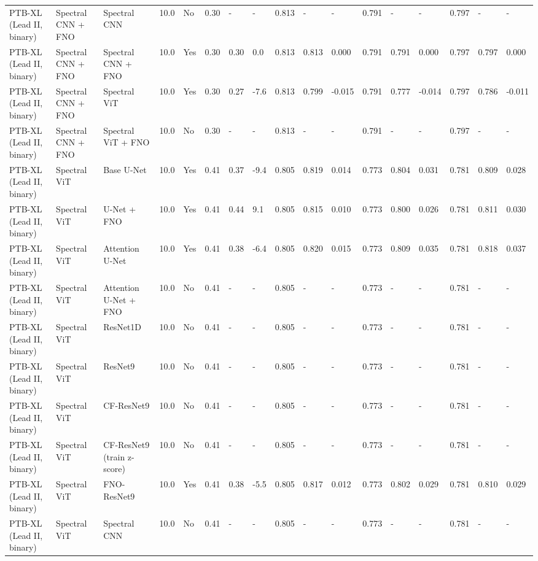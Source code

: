 \begin{longtable}{lllllllllllllllll}
PTB-XL (Lead II, binary) & Spectral CNN + FNO & Spectral CNN & 10.0 & No & 0.30 & - & - & 0.813 & - & - & 0.791 & - & - & 0.797 & - & - \\
PTB-XL (Lead II, binary) & Spectral CNN + FNO & Spectral CNN + FNO & 10.0 & Yes & 0.30 & 0.30 & 0.0 & 0.813 & 0.813 & 0.000 & 0.791 & 0.791 & 0.000 & 0.797 & 0.797 & 0.000 \\
PTB-XL (Lead II, binary) & Spectral CNN + FNO & Spectral ViT & 10.0 & Yes & 0.30 & 0.27 & -7.6 & 0.813 & 0.799 & -0.015 & 0.791 & 0.777 & -0.014 & 0.797 & 0.786 & -0.011 \\
PTB-XL (Lead II, binary) & Spectral CNN + FNO & Spectral ViT + FNO & 10.0 & No & 0.30 & - & - & 0.813 & - & - & 0.791 & - & - & 0.797 & - & - \\
PTB-XL (Lead II, binary) & Spectral ViT & Base U-Net & 10.0 & Yes & 0.41 & 0.37 & -9.4 & 0.805 & 0.819 & 0.014 & 0.773 & 0.804 & 0.031 & 0.781 & 0.809 & 0.028 \\
PTB-XL (Lead II, binary) & Spectral ViT & U-Net + FNO & 10.0 & Yes & 0.41 & 0.44 & 9.1 & 0.805 & 0.815 & 0.010 & 0.773 & 0.800 & 0.026 & 0.781 & 0.811 & 0.030 \\
PTB-XL (Lead II, binary) & Spectral ViT & Attention U-Net & 10.0 & Yes & 0.41 & 0.38 & -6.4 & 0.805 & 0.820 & 0.015 & 0.773 & 0.809 & 0.035 & 0.781 & 0.818 & 0.037 \\
PTB-XL (Lead II, binary) & Spectral ViT & Attention U-Net + FNO & 10.0 & No & 0.41 & - & - & 0.805 & - & - & 0.773 & - & - & 0.781 & - & - \\
PTB-XL (Lead II, binary) & Spectral ViT & ResNet1D & 10.0 & No & 0.41 & - & - & 0.805 & - & - & 0.773 & - & - & 0.781 & - & - \\
PTB-XL (Lead II, binary) & Spectral ViT & ResNet9 & 10.0 & No & 0.41 & - & - & 0.805 & - & - & 0.773 & - & - & 0.781 & - & - \\
PTB-XL (Lead II, binary) & Spectral ViT & CF-ResNet9 & 10.0 & No & 0.41 & - & - & 0.805 & - & - & 0.773 & - & - & 0.781 & - & - \\
PTB-XL (Lead II, binary) & Spectral ViT & CF-ResNet9 (train z-score) & 10.0 & No & 0.41 & - & - & 0.805 & - & - & 0.773 & - & - & 0.781 & - & - \\
PTB-XL (Lead II, binary) & Spectral ViT & FNO-ResNet9 & 10.0 & Yes & 0.41 & 0.38 & -5.5 & 0.805 & 0.817 & 0.012 & 0.773 & 0.802 & 0.029 & 0.781 & 0.810 & 0.029 \\
PTB-XL (Lead II, binary) & Spectral ViT & Spectral CNN & 10.0 & No & 0.41 & - & - & 0.805 & - & - & 0.773 & - & - & 0.781 & - & - \\

\end{longtable}
